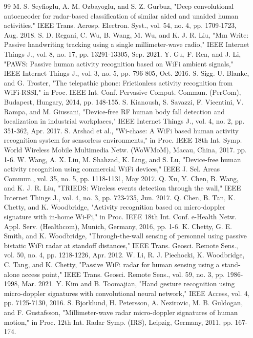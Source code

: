 \documentclass[journal]{IEEEtran}
\begin{document}
\begin{thebibliography}{99}
 M. S. Seyfioglu, A. M. Ozbayoglu, and S. Z. Gurbuz, "Deep convolutional autoencoder for radar-based classification of similar aided and unaided human activities," IEEE Trans. Aerosp. Electron. Syst., vol. 54, no. 4, pp. 1709-1723, Aug. 2018.
 S. D. Regani, C. Wu, B. Wang, M. Wu, and K. J. R. Liu, "Mm Write: Passive handwriting tracking using a single millimeter-wave radio," IEEE Internet Things J., vol. 8, no. 17, pp. 13291-13305, Sep. 2021.
 Y. Gu, F. Ren, and J. Li, "PAWS: Passive human activity recognition based on WiFi ambient signals," IEEE Internet Things J., vol. 3, no. 5, pp. 796-805, Oct. 2016.
 S. Sigg. U. Blanke, and G. Troster, "The telepathic phone: Frictionless activity recognition from WiFi-RSSI," in Proc. IEEE Int. Conf. Pervasive Comput. Commun. (PerCom), Budapest, Hungary, 2014, pp. 148-155.
 S. Kianoush, S. Savazzi, F. Vicentini, V. Rampa, and M. Giussani, "Device-free RF human body fall detection and localization in industrial workplaces," IEEE Internet Things J., vol. 4, no. 2, pp. 351-362, Apr. 2017.
 S. Arshad et al., "Wi-chase: A WiFi based human activity recognition system for sensorless environments," in Proc. IEEE 18th Int. Symp. World Wireless Mobile Multimedia Netw. (WoWMoM), Macau, China, 2017. pp. 1-6.
 W. Wang, A. X. Liu, M. Shahzad, K. Ling, and S. Lu, "Device-free human activity recognition using commercial WiFi devices," IEEE J. Sel. Areas Commun., vol. 35, no. 5, pp. 1118-1131, May 2017.
 Q. Xu, Y. Chen, B. Wang, and K. J. R. Liu, "TRIEDS: Wireless events detection through the wall," IEEE Internet Things J., vol. 4, no. 3, pp. 723-735, Jun. 2017.
 Q. Chen, B. Tan, K. Chetty, and K. Woodbridge, "Activity recognition based on micro-doppler signature with in-home Wi-Fi," in Proc. IEEE 18th Int. Conf. e-Health Netw. Appl. Serv. (Healthcom), Munich, Germany, 2016, pp. 1-6.
 K. Chetty, G. E. Smith, and K. Woodbridge, "Through-the-wall sensing of personnel using passive bistatic WiFi radar at standoff distances," IEEE Trans. Geosci. Remote Sens., vol. 50, no. 4, pp. 1218-1226, Apr. 2012.
 W. Li, R. J. Piechocki, K. Woodbridge, C. Tang, and K. Chetty, "Passive WiFi radar for human sensing using a stand-alone access point," IEEE Trans. Geosci. Remote Sens., vol. 59, no. 3, pp. 1986-1998, Mar. 2021.
 Y. Kim and B. Toomajian, "Hand gesture recognition using micro-doppler signatures with convolutional neural network," IEEE Access, vol. 4, pp. 7125-7130, 2016.
 S. Bjorklund, H. Petersson, A. Nezirovic, M. B. Guldogan, and F. Gustafsson, "Millimeter-wave radar micro-doppler signatures of human motion," in Proc. 12th Int. Radar Symp. (IRS), Leipzig, Germany, 2011, pp. 167-174.

\end{thebibliography}
\end{document}
